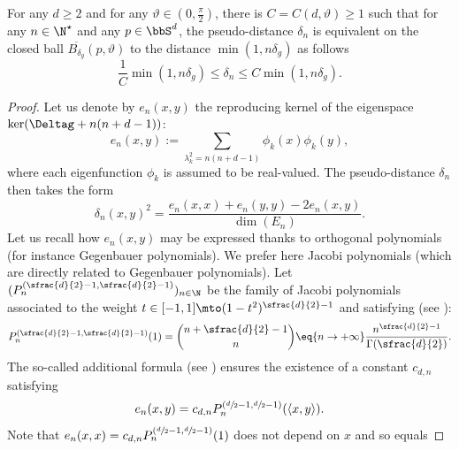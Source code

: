 \begin{theo}\label{pro-s+}
For any $d\geq 2$ and for any $\vartheta\in (0,\frac{\pi}{2})$, there is $C=C(d,\vartheta)\geq 1$ such that for any $n\in \N^\star$ and any $p\in \bbS^d$, the pseudo-distance $\delta_n$ is equivalent on the closed ball $\overline{B_{\delta_g}}(p,\vartheta)$ to the distance $\min(1,n\delta_{g})$ as follows\vspace*{-3pt}
\begin{equation*}
\frac{1}{C} \min(1,n\delta_{g})\leq \delta_n \leq C\min(1,n\delta_{g}).
\end{equation*}
\end{theo}
\begin{proof} Let us denote by $e_n(x,y)$ the reproducing kernel of the eigenspace \hbox{$\ker(\Deltag+n(n+d-1))$}:\vspace*{-3pt}
\begin{equation*}
e_n(x,y):=\sum_{\lambda_k^2=n(n+d-1)} \phi_{k}(x)\phi_{k}(y),
\end{equation*}
where each eigenfunction $\phi_{k}$ is assumed to be real-valued. The pseudo-distance $\delta_n$ then takes the form\vspace*{-3pt}
\begin{equation}\label{partn}
\delta_{n}(x,y)^2=\frac{e_n(x,x)+e_n(y,y)-2e_n(x,y)}{\dim(E_n)}.
\end{equation}
Let us recall how $e_n(x,y)$ may be expressed thanks to orthogonal polynomials (for instance Gegenbauer polynomials).
We prefer here Jacobi polynomials (which are directly related to Gegenbauer polynomials).
Let $(P_n^{(\sfrac{d}{2}-1,\sfrac{d}{2}-1)})_{n\in \N}$ be the family of Jacobi polynomials associated to the weight $t\in [-1,1]\mto (1-t^2)^{\sfrac{d}{2}-1}$ and satisfying (see \cite[p.\,58]{szeg}):\vspace*{-3pt}
\begin{equation}\label{jaco1}
P_n^{(\sfrac{d}{2}-1,\sfrac{d}{2}-1)}(1)=\binom{n + \sfrac{d}{2}-1}{n}\eq{n\to +\infty} \frac{n^{\sfrac{d}{2}-1}}{\Gamma(\sfrac{d}{2})} .
\end{equation}
The so-called additional formula (see \cite[Lem.\,2.8 (p.\,143) \& Th.\,2.14 (p.\,149)]{stein71}) ensures the existence of a constant
$c_{d,n}$ satisfying
\begin{equation}\label{KN}
e_n(x,y) =c_{d,n} P_n^{(\sfrac{d}{2}-1,\sfrac{d}{2}-1)} (\langle x,y\rangle).
\end{equation}
Note that $e_n(x,x)=c_{d,n} P_n^{\left(\sfrac{d}{2}-1,\sfrac{d}{2}-1 \right)} (1)$ does not depend on $x$ and so equals

\end{proof}
